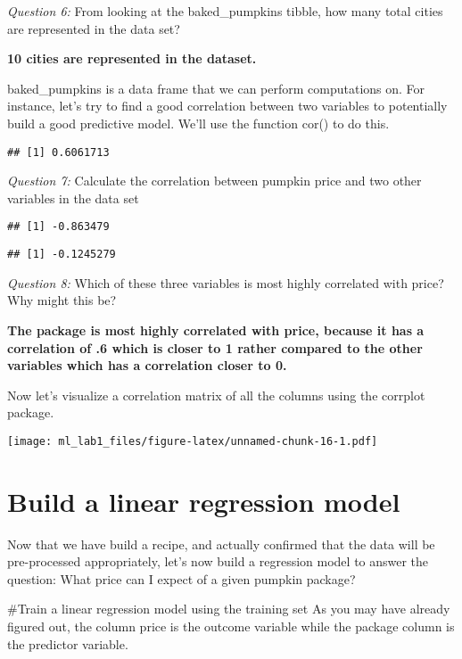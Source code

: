 \documentclass[
]{article}
\begin{document}
\emph{Question 6:} From looking at the baked\_pumpkins tibble, how many
total cities are represented in the data set?

\textbf{10 cities are represented in the dataset.}

baked\_pumpkins is a data frame that we can perform computations on. For
instance, let's try to find a good correlation between two variables to
potentially build a good predictive model. We'll use the function cor()
to do this.

\begin{verbatim}
## [1] 0.6061713
\end{verbatim}

\emph{Question 7:} Calculate the correlation between pumpkin price and
two other variables in the data set

\begin{verbatim}
## [1] -0.863479
\end{verbatim}

\begin{verbatim}
## [1] -0.1245279
\end{verbatim}

\emph{Question 8:} Which of these three variables is most highly
correlated with price? Why might this be?

\textbf{The package is most highly correlated with price, because it has
a correlation of .6 which is closer to 1 rather compared to the other
variables which has a correlation closer to 0.}

Now let's visualize a correlation matrix of all the columns using the
corrplot package.

\texttt{[image: ml\_lab1\_files/figure-latex/unnamed-chunk-16-1.pdf]}

\hypertarget{build-a-linear-regression-model}{%
\section{Build a linear regression
model}\label{build-a-linear-regression-model}}

Now that we have build a recipe, and actually confirmed that the data
will be pre-processed appropriately, let's now build a regression model
to answer the question: What price can I expect of a given pumpkin
package?

\#Train a linear regression model using the training set As you may have
already figured out, the column price is the outcome variable while the
package column is the predictor variable.
\end{document}
